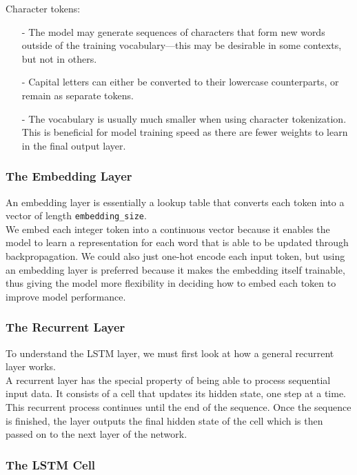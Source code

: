 \documentclass[french]{article}
\begin{document}
Character tokens:
\begin{itemize}
\item[-] The model may generate sequences of characters that form new words outside of the training vocabulary—this may be desirable in some contexts, but not in others.
\item[-] Capital letters can either be converted to their lowercase counterparts, or remain as separate tokens.
\item[-] The vocabulary is usually much smaller when using character tokenization. This is beneficial for model training speed as there are fewer weights to learn in the final output layer.
\end{itemize}

\subsubsection{The Embedding Layer}

An embedding layer is essentially a lookup table that converts each token into a vector of length \verb|embedding_size|.\\

We embed each integer token into a continuous vector because it enables the model to learn a representation for each word that is able to be updated through backpropagation. We could also just one-hot encode each input token, but using an embedding layer is preferred because it makes the embedding itself trainable, thus giving the model more flexibility in deciding how to embed each token to improve model performance.

\subsubsection{The Recurrent Layer}

To understand the LSTM layer, we must first look at how a general recurrent layer works.\\

A recurrent layer has the special property of being able to process sequential input data. It consists of a cell that updates its hidden state, one step at a time. This recurrent process continues until the end of the sequence. Once the sequence is finished, the layer outputs the final hidden state of the cell which is then passed on to the next layer of the network.

\subsubsection{The LSTM Cell}
\end{document}
